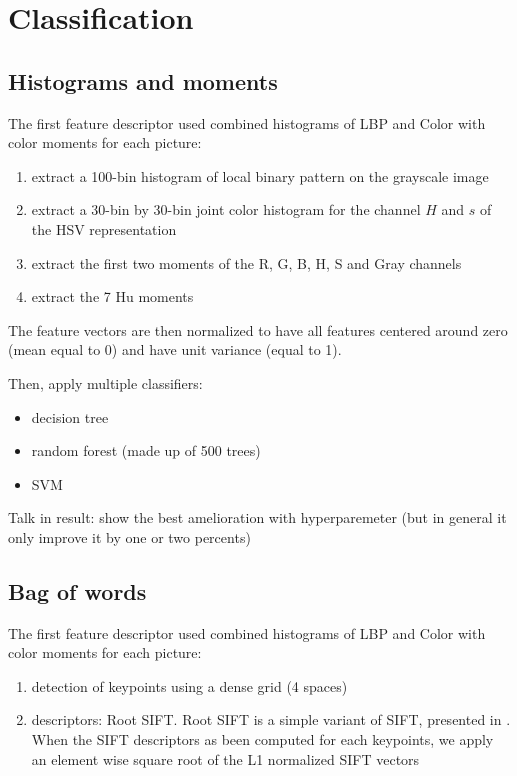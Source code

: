 \section{Classification}

\subsection{Histograms and moments}

The first feature descriptor used combined histograms of LBP and Color with color moments for each picture:
\begin{enumerate}
    \item extract a 100-bin histogram of local binary pattern on the grayscale image
    \item extract a 30-bin by 30-bin joint color histogram for the channel $H$ and $s$ of the HSV  representation
    \item extract the first two moments of the R, G, B, H, S and Gray channels
    \item extract the 7 Hu moments
\end{enumerate}

The feature vectors are then normalized to have all features centered around zero (mean equal to 0) and have unit variance (equal to 1).

Then, apply multiple classifiers:
\begin{itemize}
    \item decision tree
    \item random forest (made up of 500 trees)
    \item SVM
\end{itemize}

Talk in result: show the best amelioration with hyperparemeter (but in general it only improve it by one or two percents)

\subsection{Bag of words}

The first feature descriptor used combined histograms of LBP and Color with color moments for each picture:
\begin{enumerate}
    \item detection of keypoints using a dense grid (4 spaces)
    \item descriptors: Root SIFT. Root SIFT is a simple variant of SIFT, presented in \cite{Arandjelovic2012}. When the SIFT descriptors as been computed for each keypoints, we apply an element wise square root of the L1 normalized SIFT vectors
\end{enumerate}

